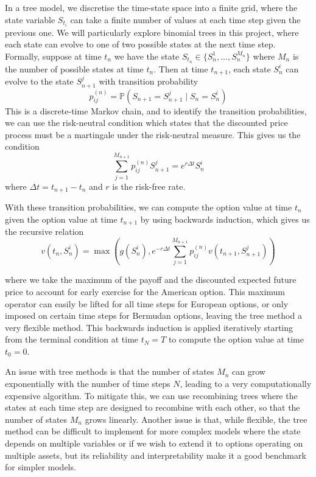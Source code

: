In a tree model, we discretise the time-state space into a finite grid, where the state variable $S_{t_i}$ can take a finite number of values at each time step given the previous one. We will particularly explore binomial trees in this project, where each state can evolve to one of two possible states at the next time step. Formally, suppose at time $t_n$ we have the state $S_{t_n} \in \{S_n^1, \dots, S_n^{M_n}\}$ where $M_n$ is the number of possible states at time $t_n$. Then at time $t_{n+1}$, each state $S_n^i$ can evolve to the state $S_{n+1}^j$ with transition probability
\begin{equation}
    p_{ij}^{(n)} = \mathbb P(S_{n+1} = S_{n+1}^j \mid S_n = S_n^i)
\end{equation}
This is a discrete-time Markov chain, and to identify the transition probabilities, we can use the risk-neutral condition which states that the discounted price process must be a martingale under the risk-neutral measure. This gives us the condition
\begin{equation}
    \sum_{j=1}^{M_{n+1}} p_{ij}^{(n)} S_{n+1}^j = e^{r\Delta t} S_n^i
\end{equation}
where $\Delta t = t_{n+1} - t_n$ and $r$ is the risk-free rate.

With these transition probabilities, we can compute the option value at time $t_n$ given the option value at time $t_{n+1}$ by using backwards induction, which gives us the recursive relation
\begin{equation}
    v(t_n, S_n^i) = \max\left( g(S_n^i), e^{-r\Delta t} \sum_{j=1}^{M_{n+1}} p_{ij}^{(n)} v(t_{n+1}, S_{n+1}^j) \right)
\end{equation}

where we take the maximum of the payoff and the discounted expected future price to account for early exercise for the American option. This maximum operator can easily be lifted for all time steps for European options, or only imposed on certain time steps for Bermudan options, leaving the tree method a very flexible method. This backwards induction is applied iteratively starting from the terminal condition at time $t_N = T$ to compute the option value at time $t_0 = 0$.

An issue with tree methods is that the number of states $M_n$ can grow exponentially with the number of time steps $N$, leading to a very computationally expensive algorithm. To mitigate this, we can use recombining trees where the states at each time step are designed to recombine with each other, so that the number of states $M_n$ grows linearly. Another issue is that, while flexible, the tree method can be difficult to implement for more complex models where the state depends on multiple variables or if we wish to extend it to options operating on multiple assets, but its reliability and interpretability make it a good benchmark for simpler models.

